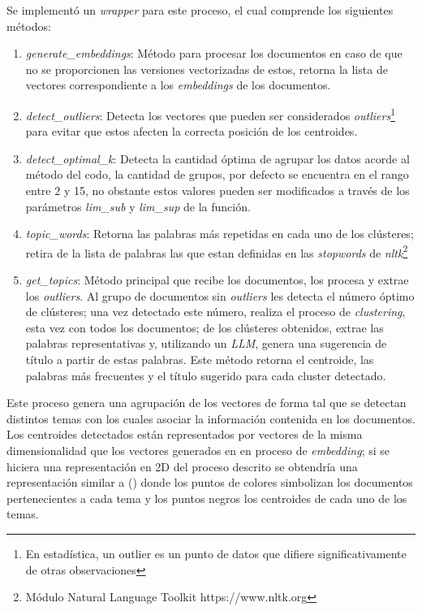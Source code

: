    Se implementó un \emph{wrapper} para este proceso, el cual comprende los siguientes métodos:
    \begin{enumerate}
        \item \emph{generate\_embeddings}: Método para procesar los documentos en caso de que no se proporcionen las versiones vectorizadas de estos, retorna la lista de vectores correspondiente a los \emph{embeddings} de los documentos.
        \item \emph{detect\_outliers}: Detecta los vectores que pueden ser considerados \emph{outliers}\footnote{En estadística, un outlier es un punto de datos que difiere significativamente de otras observaciones} para evitar que estos afecten la correcta posición de los centroides.
        \item \emph{detect\_optimal\_k}: Detecta la cantidad óptima de agrupar los datos acorde al método del codo, la cantidad de grupos, por defecto se encuentra en el rango entre 2 y 15, no obstante estos valores pueden ser modificados a través de los parámetros \emph{lim\_sub} y \emph{lim\_sup} de la función.
        \item \emph{topic\_words}: Retorna las palabras más repetidas en cada uno de los cl\'usteres; retira de la lista de palabras las que estan definidas en las \emph{stopwords} de \emph{nltk}\footnote{Módulo Natural Language Toolkit https://www.nltk.org}
        \item \emph{get\_topics}: Método principal que recibe los documentos, los procesa y extrae los \emph{outliers}. Al grupo de documentos sin \emph{outliers} les detecta el número óptimo de cl\'usteres; una vez detectado este número, realiza el proceso de \emph{clustering}, esta vez con todos los documentos; de los cl\'usteres obtenidos, extrae las palabras representativas y, utilizando un \emph{LLM}, genera una sugerencia de título a partir de estas palabras. Este método retorna el centroide, las palabras más frecuentes y el título sugerido para cada cluster detectado.
    \end{enumerate}

    Este proceso genera una agrupación de los vectores de forma tal que se detectan distintos temas con los cuales asociar la información contenida en los documentos. Los centroides detectados están representados por vectores de la misma dimensionalidad que los vectores generados en en proceso de \emph{embedding}; si se hiciera una representación en 2D del proceso descrito se obtendría una representación similar a () donde los puntos de colores simbolizan los documentos pertenecientes a cada tema y los puntos negros los centroides de cada uno de los temas.

